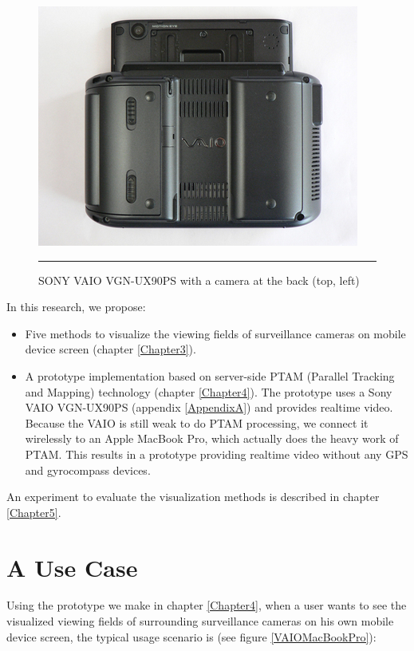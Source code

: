\begin{figure}[htbp]
	\centering
	\includegraphics{./Primitives/vaio_back.jpg}
	\rule{35em}{0.5pt}
	\caption[SONY VAIO VGN-UX90PS with a camera at the back]{SONY VAIO VGN-UX90PS with a camera at the back (top, left)}
	\label{fig:VAIOBack}
\end{figure}

In this research, we propose:

\begin{itemize}
	\item Five methods to visualize the viewing fields of surveillance cameras on mobile device screen (chapter \ref{Chapter3}).
	\item A prototype implementation based on server-side PTAM (Parallel Tracking and Mapping) \citep{Reference12} technology (chapter \ref{Chapter4}). The prototype uses a Sony VAIO VGN-UX90PS (appendix \ref{AppendixA}) and provides realtime video. Because the VAIO is still weak to do PTAM processing, we connect it wirelessly to an Apple MacBook Pro, which actually does the heavy work of PTAM. This results in a prototype providing realtime video without any GPS and gyrocompass devices.
\end{itemize}

An experiment to evaluate the visualization methods is described in chapter \ref{Chapter5}.

\section{A Use Case}
\label{AUseCase}

Using the prototype we make in chapter \ref{Chapter4}, when a user wants to see the visualized viewing fields of surrounding surveillance cameras on his own mobile device screen, the typical usage scenario is (see figure \ref{VAIOMacBookPro}):

